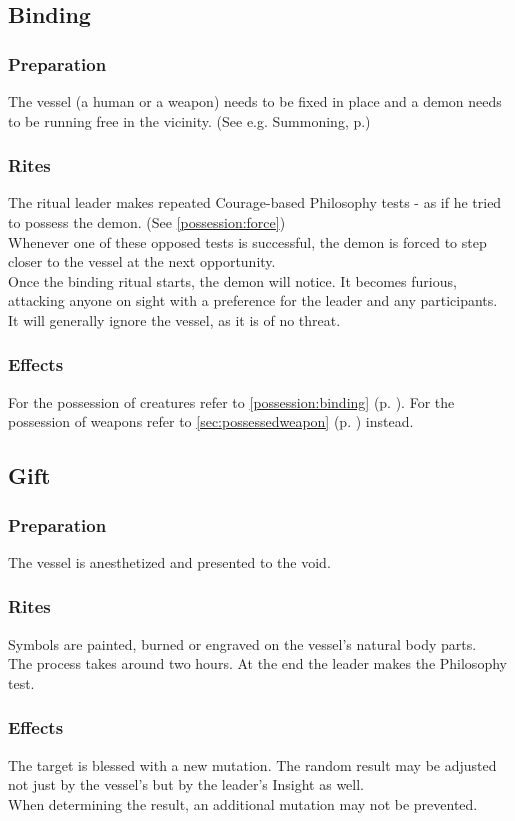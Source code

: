 \subsection*{Binding}
\label{ritual:binding}
\subsubsection*{Preparation}
The vessel (a human or a weapon) needs to be fixed in place and a demon needs to be running free in the vicinity.
(See e.g. Summoning, p.\pageref{ritual:summoning})
\subsubsection*{Rites}
The ritual leader makes repeated Courage-based Philosophy tests
- as if he tried to possess the demon.
(See \ref{possession:force})
\\%
Whenever one of these opposed tests is successful,
the demon is forced to step closer to the vessel at the next opportunity.
\\%
Once the binding ritual starts, the demon will notice.
It becomes furious, attacking anyone on sight with a preference for the leader and any participants.
It will generally ignore the vessel, as it is of no threat.
\subsubsection*{Effects}
For the possession of creatures refer to \ref{possession:binding} (p. \pageref{possession:binding}).
For the possession of weapons refer to \ref{sec:possessedweapon} (p. \pageref{sec:possessedweapon}) instead.

\subsection*{Gift}
\subsubsection*{Preparation}
The vessel is anesthetized and presented to the void.
\subsubsection*{Rites}
Symbols are painted, burned or engraved on the vessel's natural body parts.
\\%
The process takes around two hours.
At the end the leader makes the Philosophy test.
\subsubsection*{Effects}
The target is blessed with a new mutation.
The random result may be adjusted not just by the vessel's
	but by the leader's Insight as well.
\\%
When determining the result,
	an additional mutation may not be prevented.

